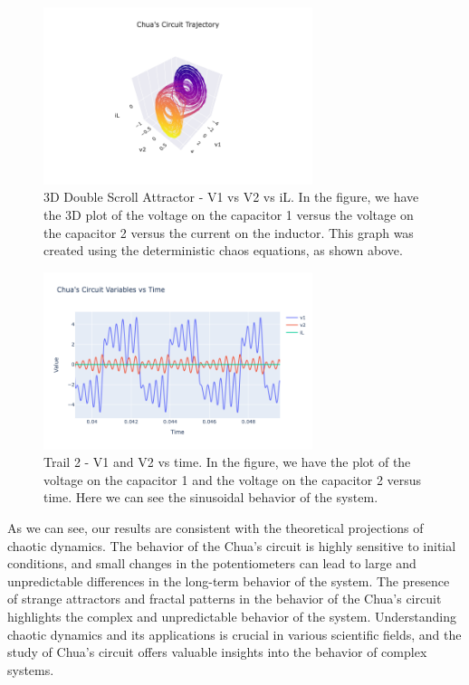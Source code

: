 \documentclass[12pt]{article}
\begin{document}
                        
                \begin{figure}[!htb]
                        \centering
                        \includegraphics[width=0.7\textwidth]{./img/plots/3d_double_scroll.png}
                        \caption{3D Double Scroll Attractor - V1 vs V2 vs iL. In the figure, we have the 3D plot of the voltage on the capacitor 1 
                        versus the voltage on the capacitor 2 versus the current on the inductor. This graph was created using the deterministic chaos equations, as shown above.}
                        \label{fig: 3D Double Scroll Attractor - V1 vs V2 vs iL.}
                \end{figure} \pagebreak
                \begin{figure}[!htb]
                        \centering
                        \includegraphics[width=0.7\textwidth]{./img/plots/Chua_Circuit_Variables_vs_Time.png}
                        \caption{Trail 2 - V1 and V2 vs time. In the figure, we have the plot of the voltage on the capacitor 1 and the voltage on the capacitor 2 versus time. 
                        Here we can see the sinusoidal behavior of the system. }
                \end{figure}
        


                As we can see, our results are consistent with the theoretical projections of chaotic dynamics. 
                The behavior of the Chua's circuit is highly sensitive to initial conditions, and small changes in the potentiometers 
                can lead to large and unpredictable differences in the long-term behavior of the system. The presence of strange attractors 
                and fractal patterns in the behavior of the Chua's circuit highlights the complex and unpredictable behavior of the system. 
                Understanding chaotic dynamics and its applications is crucial in various scientific fields, and the study of Chua's circuit offers 
                valuable insights into the behavior of complex systems.
\end{document}
